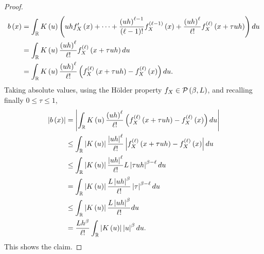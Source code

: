\begin{proof}
  \begin{equation*}
    \begin{split}
      b\left(x\right) & = \int_{\mathbb{R}} K\left(u\right) \left(uh f_X'\left(x\right) + \cdots  + \frac{\left(uh\right)^{\ell -1}}{\left(\ell -1\right)!} f_X^{\left(\ell -1\right)}\left(x\right)+ \frac{\left(uh\right)^\ell}{\ell !}f_X^{\left(\ell\right)}\left(x+\tau uh \right)\right) du \\
              & = \int_{\mathbb{R}} K\left(u\right) \frac{\left(uh\right)^\ell}{\ell !}f_X^{\left(\ell\right)}\left(x+\tau uh \right) du                                                                                                  \\
              & = \int_{\mathbb{R}} K\left(u\right) \frac{\left(uh\right)^\ell}{\ell !} \left( f_X^{\left(\ell\right)}\left(x+\tau uh \right) - f_X^{\left(\ell\right)}\left(x\right)\right) du.
    \end{split}
  \end{equation*}
  Taking absolute values, using the Hölder property $f_X\in \mathcal{P}\left(\beta, L\right)$, and recalling finally $0\leq \tau \leq 1$,
  \begin{equation*}
    \begin{split}
      \left| b\left(x\right)\right| & = \left| \int_{\mathbb{R}} K\left(u\right) \frac{\left(uh\right)^\ell}{\ell !} \left( f_X^{\left(\ell\right)}\left(x+\tau uh \right) - f_X^{\left(\ell\right)}\left(x\right)\right) du\right|      \\
                    & \leq \int_{\mathbb{R}} \left| K\left(u\right)\right| \frac{\left| uh\right|^\ell}{\ell !} \left|  f_X^{\left(\ell\right)}\left(x+\tau uh \right) - f_X^{\left(\ell\right)}\left(x\right)\right| du \\
                    & \leq \int_{\mathbb{R}} \left| K\left(u\right)\right| \frac{\left| uh\right|^\ell}{\ell !} L\left| \tau u h\right|^{\beta - \ell} du                                \\
                    & = \int_{\mathbb{R}} \left| K\left(u\right)\right|  \frac{L\left| uh\right|^{\beta}}{\ell !} \left| \tau\right|^{\beta - \ell} du                                   \\
                    & \leq  \int_{\mathbb{R}} \left| K\left(u\right)\right|  \frac{L\left| uh\right|^{\beta}}{\ell !} du                                                         \\
                    & = \frac{L h^\beta}{\ell !}\int_{\mathbb{R}} \left| K\left(u\right)\right|\left| u\right|^{\beta} du.\end{split}
  \end{equation*}
  This shows the claim.
\end{proof}
